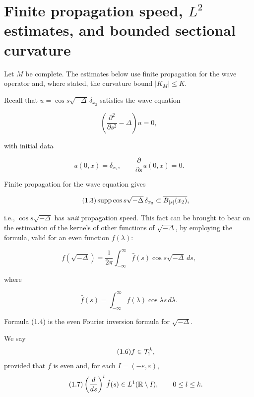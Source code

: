 \chapter{Finite propagation speed, \texorpdfstring{$L^2$}{L2} estimates, and bounded sectional curvature}

Let $M$ be complete. The estimates below use finite propagation for the wave
operator and, where stated, the curvature bound $\lvert K_M\rvert\leq K$.

Recall that $u=\cos s\sqrt{-\Delta}\,\delta_{x_2}$ satisfies the wave equation

\begin{equation}\tag{1.1}
\left(\frac{\partial^2}{\partial s^2}-\Delta\right)u=0,
\end{equation}

with initial data

\begin{equation}\tag{1.2}
u(0,x)=\delta_{x_2}, \qquad \frac{\partial}{\partial s}u(0,x)=0.
\end{equation}

Finite propagation for the wave equation gives

\begin{equation}\tag{1.3}
\operatorname{supp} \cos s\sqrt{-\Delta}\,\delta_{x_2}\subset \overline{B_{|s|}(x_2)},
\end{equation}

i.e., $\cos s\sqrt{-\Delta}$ has \emph{unit} propagation speed. This fact can be
brought to bear on the estimation of the kernels of other functions of
$\sqrt{-\Delta}$, by employing the formula, valid for an even function $f(\lambda)$:

\begin{equation}\tag{1.4}
f(\sqrt{-\Delta})=\frac{1}{2\pi}\int_{-\infty}^{\infty}\hat f(s)\cos s\sqrt{-\Delta}\,ds,
\end{equation}

where

\begin{equation}\tag{1.5}
\hat f(s)=\int_{-\infty}^{\infty}f(\lambda)\cos \lambda s\,d\lambda.
\end{equation}

Formula (1.4) is the even Fourier inversion formula for $\sqrt{-\Delta}$.

\begin{definition}
\label{def:finite-propagation-class}

We say
\begin{equation}\tag{1.6}
f \in \mathcal{T}_1^k,
\end{equation}
provided that $f$ is even and, for each $I = (-\varepsilon, \varepsilon)$,
\begin{equation}\tag{1.7}
\left(\frac{d}{ds}\right)^l \hat{f}(s) \in L^1(\mathbb{R} \setminus I), \qquad 0 \leq l \leq k.
\end{equation}
\end{definition}


